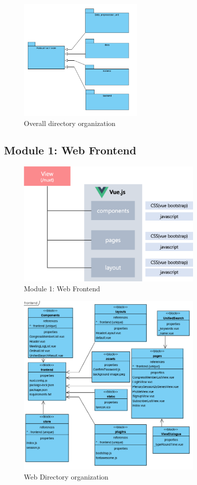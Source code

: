 \documentclass[conference]{IEEEtran}
\begin{document}
\begin{figure}[htbp]
\centerline{\includegraphics[width=60mm,scale=0.5]{fig/overall.png}}
\caption{Overall directory organization}
\label{fig}
\end{figure}



\subsection{Module 1: Web Frontend}

\begin{figure}[htbp]
\centerline{\includegraphics[width=90mm,scale=0.5]{fig/6_4.png}}
\caption{Module 1: Web Frontend}
\label{fig}
\end{figure}


\begin{figure}[htbp]
\centerline{\includegraphics[width=90mm,scale=0.5]{fig/6_5.png}}
\caption{Web Directory organization}
\label{fig}
\end{figure}
\end{document}
